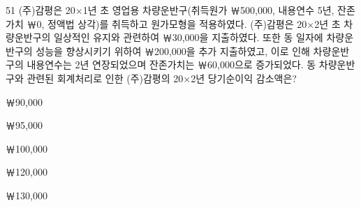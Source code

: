 \begin{question}{51}
(주)감평은 20×1년 초 영업용 차량운반구(취득원가 ￦500,000, 내용연수 5년, 잔존가치 ￦0, 정액법 상각)를 취득하고 원가모형을 적용하였다. (주)감평은 20×2년 초 차량운반구의 일상적인 유지와 관련하여 ￦30,000을 지출하였다. 또한 동 일자에 차량운반구의 성능을 향상시키기 위하여 ￦200,000을 추가 지출하였고, 이로 인해 차량운반구의 내용연수는 2년 연장되었으며 잔존가치는 ￦60,000으로 증가되었다. 동 차량운반구와 관련된 회계처리로 인한 (주)감평의 20×2년 당기순이익 감소액은?
\begin{choices}
  \item ￦90,000
  \item ￦95,000
  \item ￦100,000
  \item ￦120,000
  \item ￦130,000
\end{choices}
\end{question}
